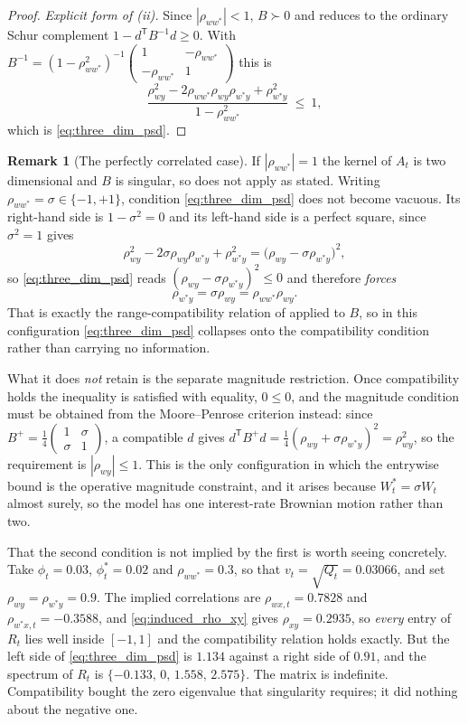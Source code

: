 \documentclass[11pt]{article}
\theoremstyle{definition}
\newtheorem{remark}[remark]{Remark}
\begin{document}
\begin{proof}
\emph{Explicit form of \textnormal{(ii)}.} Since $|\rho_{ww^*}|<1$, $B\succ0$ and  reduces to the ordinary Schur complement $1-d^{\mathsf T}B^{-1}d\ge0$. With
$B^{-1}=(1-\rho_{ww^*}^2)^{-1}\left(\begin{smallmatrix}1&-\rho_{ww^*}\\-\rho_{ww^*}&1\end{smallmatrix}\right)$
this is
\[
\frac{\rho_{wy}^2-2\rho_{ww^*}\rho_{wy}\rho_{w^*y}+\rho_{w^*y}^2}{1-\rho_{ww^*}^2}\ \le\ 1,
\]
which is \eqref{eq:three_dim_psd}.
\end{proof}

\begin{remark}[The perfectly correlated case]\label{rem:perfect_ww}
If $|\rho_{ww^*}|=1$ the kernel of $A_t$ is two dimensional and $B$ is singular, so  does not apply as stated. Writing $\rho_{ww^*}=\sigma\in\{-1,+1\}$, condition \eqref{eq:three_dim_psd} does not become vacuous. Its right-hand side is $1-\sigma^2=0$ and its left-hand side is a perfect square, since $\sigma^2=1$ gives
\[
\rho_{wy}^2-2\sigma\rho_{wy}\rho_{w^*y}+\rho_{w^*y}^2=\bigl(\rho_{wy}-\sigma\rho_{w^*y}\bigr)^2,
\]
so \eqref{eq:three_dim_psd} reads $(\rho_{wy}-\sigma\rho_{w^*y})^2\le0$ and therefore \emph{forces}
\[
\rho_{w^*y}=\sigma\rho_{wy}=\rho_{ww^*}\rho_{wy}.
\]
That is exactly the range-compatibility relation of  applied to $B$, so in this configuration \eqref{eq:three_dim_psd} collapses onto the compatibility condition rather than carrying no information.

What it does \emph{not} retain is the separate magnitude restriction. Once compatibility holds the inequality is satisfied with equality, $0\le0$, and the magnitude condition must be obtained from the Moore--Penrose criterion instead: since $B^{+}=\tfrac14\left(\begin{smallmatrix}1&\sigma\\\sigma&1\end{smallmatrix}\right)$, a compatible $d$ gives $d^{\mathsf T}B^{+}d=\tfrac14(\rho_{wy}+\sigma\rho_{w^*y})^2=\rho_{wy}^2$, so the requirement is $|\rho_{wy}|\le1$. This is the only configuration in which the entrywise bound is the operative magnitude constraint, and it arises because $W_t^*=\sigma W_t$ almost surely, so the model has one interest-rate Brownian motion rather than two.
\end{remark}

That the second condition is not implied by the first is worth seeing concretely. Take $\phi_t=0.03$, $\phi_t^*=0.02$ and $\rho_{ww^*}=0.3$, so that $v_t=\sqrt{Q_t}=0.03066$, and set $\rho_{wy}=\rho_{w^*y}=0.9$. The implied correlations are $\rho_{wx,t}=0.7828$ and $\rho_{w^*x,t}=-0.3588$, and \eqref{eq:induced_rho_xy} gives $\rho_{xy}=0.2935$, so \emph{every} entry of $R_t$ lies well inside $[-1,1]$ and the compatibility relation holds exactly. But the left side of \eqref{eq:three_dim_psd} is $1.134$ against a right side of $0.91$, and the spectrum of $R_t$ is $\{-0.133,\,0,\,1.558,\,2.575\}$. The matrix is indefinite. Compatibility bought the zero eigenvalue that singularity requires; it did nothing about the negative one.
\end{document}
